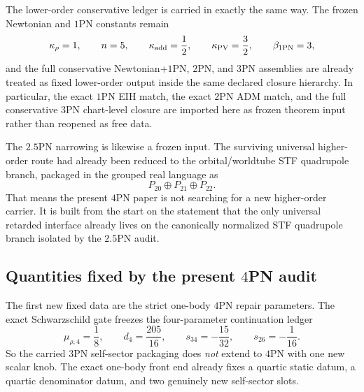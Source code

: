 \documentclass[11pt]{article}
\begin{document}
The lower-order conservative ledger is carried in exactly the same way.  The
frozen Newtonian and $1$PN constants remain
\begin{equation}
\kappa_\rho=1,
\qquad
n=5,
\qquad
\kappa_{\rm add}=\frac12,
\qquad
\kappa_{\rm PV}=\frac32,
\qquad
\beta_{\rm 1PN}=3,
\label{eq:fixed-open-lower-order-ledger}
\end{equation}
and the full conservative Newtonian+$1$PN, $2$PN, and $3$PN assemblies are
already treated as fixed lower-order output inside the same declared closure
hierarchy.  In particular, the exact $1$PN EIH match, the exact $2$PN ADM
match, and the full conservative $3$PN chart-level closure are imported here as
frozen theorem input rather than reopened as free data.

The $2.5$PN narrowing is likewise a frozen input.  The surviving universal
higher-order route had already been reduced to the orbital/worldtube STF
quadrupole branch, packaged in the grouped real language as
\begin{equation}
P_{20}\oplus P_{21}\oplus P_{22}.
\label{eq:fixed-open-grouped-bundle}
\end{equation}
That means the present $4$PN paper is not searching for a new higher-order
carrier.  It is built from the start on the statement that the only universal
retarded interface already lives on the canonically normalized STF quadrupole
branch isolated by the $2.5$PN audit.

\subsection{Quantities fixed by the present \texorpdfstring{$4$}{4}PN audit}
\label{sec:fixed-open-fixed-now}

The first new fixed data are the strict one-body $4$PN repair parameters.  The
exact Schwarzschild gate freezes the four-parameter continuation ledger
\begin{equation}
\mu_{\rho,4}=\frac18,
\qquad
 d_4=\frac{205}{16},
\qquad
 s_{34}=-\frac{15}{32},
\qquad
 s_{26}=-\frac1{16}.
\label{eq:fixed-open-onebody-ledger}
\end{equation}
So the carried $3$PN self-sector packaging does \emph{not} extend to $4$PN with
one new scalar knob.  The exact one-body front end already fixes a quartic
static datum, a quartic denominator datum, and two genuinely new self-sector
slots.
\end{document}
